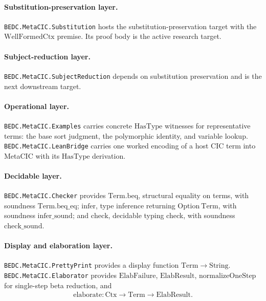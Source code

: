 \paragraph{Substitution-preservation layer.}
\texttt{BEDC.MetaCIC.Substitution} hosts the substitution-preservation target
with the $\mathrm{WellFormedCtx}$ premise. Its proof body is the active
research target.

\paragraph{Subject-reduction layer.}
\texttt{BEDC.MetaCIC.SubjectReduction} depends on substitution preservation
and is the next downstream target.

\paragraph{Operational layer.} \texttt{BEDC.MetaCIC.Examples} carries
concrete $\mathrm{HasType}$ witnesses for representative terms: the base sort
judgment, the polymorphic identity, and variable lookup.
\texttt{BEDC.MetaCIC.LeanBridge} carries one worked encoding of a host CIC
term into MetaCIC with its $\mathrm{HasType}$ derivation.

\paragraph{Decidable layer.} \texttt{BEDC.MetaCIC.Checker} provides
$\mathrm{Term.beq}$, structural equality on terms, with soundness
$\mathrm{Term.beq\_eq}$; $\mathrm{infer}$, type inference returning
$\mathrm{Option}\ \mathrm{Term}$, with soundness $\mathrm{infer\_sound}$; and
$\mathrm{check}$, decidable typing check, with soundness
$\mathrm{check\_sound}$.

\paragraph{Display and elaboration layer.}
\texttt{BEDC.MetaCIC.PrettyPrint} provides a display function
$\mathrm{Term} \to \mathrm{String}$. \texttt{BEDC.MetaCIC.Elaborator}
provides $\mathrm{ElabFailure}$, $\mathrm{ElabResult}$,
$\mathrm{normalizeOneStep}$ for single-step beta reduction, and
$$
\begin{aligned}
\mathrm{elaborate} : \mathrm{Ctx} \to \mathrm{Term} \to \mathrm{ElabResult}.
\end{aligned}
$$

